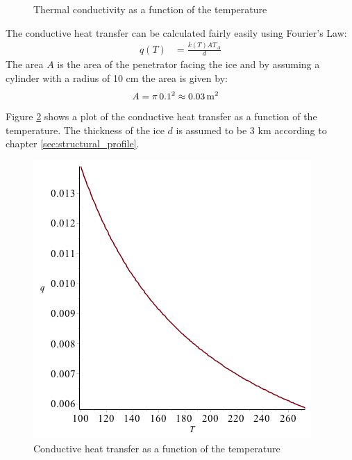 \begin{figure}[htb]
	\centering
	\caption{Thermal conductivity as a function of the temperature}
	\label{fig:T_vs_k}
\end{figure}
The conductive heat transfer can be calculated fairly easily using Fourier's Law\cite{website:conductiveHeatTransfer}:
\begin{align}
	q(T) &= \frac{k(T) A T_\Delta}{d}
\end{align}
The area $A$ is the area of the penetrator facing the ice and by assuming a cylinder with a radius of 10 cm the area is given by:
\begin{align}
	A &= \pi \, 0.1^2 \approx \unit[0.03]{m^2}
\end{align}
Figure \ref{fig:T_vs_q} shows a plot of the conductive heat transfer as a function of the temperature. The thickness of the ice $d$ is assumed to be 3 km according to chapter \ref{sec:structural_profile}.
\begin{figure}[htb]
	\centering
	\includegraphics[width=.48\textwidth]{figures/temperature/T_vs_q}
	\caption{Conductive heat transfer as a function of the temperature}
	\label{fig:T_vs_q}
\end{figure}
